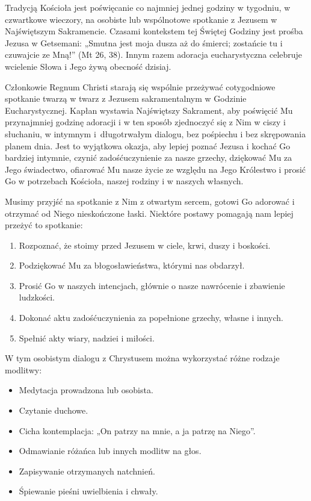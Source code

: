 ﻿\documentclass[9pt,twoside]{extarticle}
\begin{document}
{\hnr Tradycją Kościoła jest poświęcanie co najmniej jednej godziny w tygodniu, w czwartkowe wieczory, na osobiste lub wspólnotowe spotkanie z Jezusem w Najświętszym Sakramencie. Czasami kontekstem tej Świętej Godziny jest prośba Jezusa w Getsemani: „Smutna jest moja dusza aż do śmierci; zostańcie tu i czuwajcie ze Mną!” (Mt 26, 38). Innym razem adoracja eucharystyczna celebruje wcielenie Słowa i Jego żywą obecność dzisiaj.


Członkowie Regnum Christi starają się wspólnie przeżywać cotygodniowe spotkanie twarzą w twarz z Jezusem sakramentalnym w Godzinie Eucharystycznej. Kapłan wystawia Najświętszy Sakrament, aby poświęcić Mu przynajmniej godzinę adoracji i w ten sposób zjednoczyć się z Nim w ciszy i słuchaniu, w intymnym i~długotrwałym dialogu, bez pośpiechu i bez skrępowania planem dnia. Jest to wyjątkowa okazja, aby lepiej poznać Jezusa i kochać Go bardziej intymnie, czynić zadośćuczynienie za nasze grzechy, dziękować Mu za Jego świadectwo, ofiarować Mu nasze życie ze względu na Jego Królestwo i prosić Go w potrzebach Kościoła, naszej rodziny i w naszych własnych.


Musimy przyjść na spotkanie z Nim z otwartym sercem, gotowi Go adorować i otrzymać od Niego nieskończone łaski. Niektóre postawy pomagają nam lepiej przeżyć to spotkanie:


\begin{enumerate}
\item Rozpoznać, że stoimy przed Jezusem w ciele, krwi, duszy i boskości.
\item Podziękować Mu za błogosławieństwa, którymi nas obdarzył.
\item Prosić Go w naszych intencjach, głównie o nasze nawrócenie i zbawienie ludzkości.
\item Dokonać aktu zadośćuczynienia za popełnione grzechy, własne i innych.
\item Spełnić akty wiary, nadziei i miłości.
\end{enumerate}


W tym osobistym dialogu z Chrystusem można wykorzystać różne rodzaje modlitwy:
\begin{itemize}
\item Medytacja prowadzona lub osobista.
\item Czytanie duchowe.
\item Cicha kontemplacja: „On patrzy na mnie, a ja patrzę na Niego”.
\item Odmawianie różańca lub innych modlitw na głos.
\item Zapisywanie otrzymanych natchnień.
\item Śpiewanie pieśni uwielbienia i chwały.
\end{itemize}}
\end{document}
